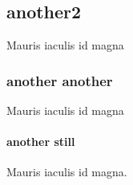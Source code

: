 \documentclass[a4paper,12pt]{article} %
\begin{document}
\subsection{another2}
Mauris iaculis id magna
\subsubsection{another another}
Mauris iaculis id magna
\paragraph{another still}
Mauris iaculis id magna. 






\end{document}
